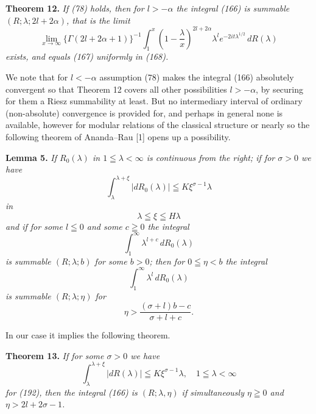 \documentclass[12pt]{article}
\begin{document}
\noindent\textbf{Theorem 12.} \emph{If (78) holds, then for \(l > -\alpha\) the integral (166) is summable \((R; \lambda; 2l + 2\alpha)\), that is the limit}
\begin{equation}
\lim_{x \to \infty} \{\Gamma(2l + 2\alpha + 1)\}^{-1} \int_1^x \left(1 - \frac{\lambda}{x}\right)^{2l+2\alpha} \lambda^l e^{-2it\lambda^{1/2}} \, dR(\lambda)
\tag{190}
\end{equation}
\emph{exists, and equals (167) uniformly in (168).}

We note that for \(l < -\alpha\) assumption (78) makes the integral (166) absolutely convergent so that Theorem 12 covers all other possibilities \(l > -\alpha\), by securing for them a Riesz summability at least. But no intermediary interval of ordinary (non-absolute) convergence is provided for, and perhaps in general none is available, however for modular relations of the classical structure or nearly so the following theorem of Ananda–Rau [1] opens up a possibility.

\medskip

\noindent\textbf{Lemma 5.} \emph{If \(R_0(\lambda)\) in \(1 \leqq \lambda < \infty\) is continuous from the right; if for \(\sigma > 0\) we have}
\begin{equation}
\int_\lambda^{\lambda+ \xi} |dR_0(\lambda)| \leqq K\xi^{\sigma-1} \lambda
\tag{191}
\end{equation}
\emph{in}
\begin{equation}
\lambda \leqq \xi \leqq H\lambda
\tag{192}
\end{equation}
\emph{and if for some \(l \leqq 0\) and some \(c \geqq 0\) the integral}
\begin{equation}
\int_1^{\infty} \lambda^{l+c} \, dR_0(\lambda)
\tag{193}
\end{equation}
\emph{is summable \((R; \lambda; b)\) for some \(b > 0\); then for \(0 \leqq \eta < b\) the integral}
\begin{equation}
\int_1^{\infty} \lambda^l \, dR_0(\lambda)
\tag{194}
\end{equation}
\emph{is summable \((R; \lambda; \eta)\) for}
\begin{equation}
\eta > \frac{(\sigma + l)b - c}{\sigma + l + c}.
\tag{195}
\end{equation}

In our case it implies the following theorem.

\medskip

\noindent\textbf{Theorem 13.} \emph{If for some \(\sigma > 0\) we have}
\begin{equation}
\int_\lambda^{\lambda+ \xi} |dR(\lambda)| \leqq K\xi^{\sigma-1} \lambda, \quad 1 \leqq \lambda < \infty
\tag{196}
\end{equation}
\emph{for (192), then the integral (166) is \((R; \lambda, \eta)\) if simultaneously \(\eta \geqq 0\) and \(\eta > 2l + 2\sigma - 1\).}
\end{document}
